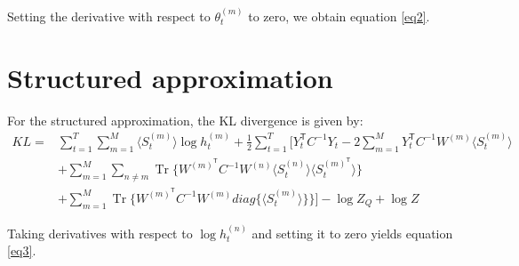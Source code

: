 \documentclass{article}
\DeclareMathOperator{\Tr}{Tr}
\begin{document}
Setting the derivative with respect to $\theta_t^{(m)}$ to zero, we obtain equation \ref{eq2}.

\section{Structured approximation}

For the structured approximation, the KL divergence is given by:
\begin{align*}
KL = &\sum_{t=1}^T \sum_{m=1}^M \langle S_t^{(m)} \rangle \log h_t^{(m)} + \frac{1}{2} \sum_{t=1}^T \Bigg[ Y_t^\mathsf{T} C^{-1} Y_t - 2 \sum_{m=1}^M Y_t^\mathsf{T} C^{-1} W^{(m)} \langle S_t^{(m)} \rangle \\
&+ \sum_{m=1}^M \sum_{n \ne m} \Tr\bigg\{ W^{(m)^\mathsf{T}} C^{-1} W^{(n)} \langle S_t^{(n)} \rangle \langle S_t^{(m)^\mathsf{T}} \rangle \bigg\} \\
&+ \sum_{m=1}^M \Tr\bigg\{ W^{(m)^\mathsf{T}} C^{-1} W^{(m)} diag\Big\{\langle S_t^{(m)} \rangle\Big\} \bigg\} \Bigg] - \log Z_Q + \log Z
\end{align*}

Taking derivatives with respect to $\log h_t^{(n)}$ and setting it to zero yields equation \ref{eq3}.
\end{document}
